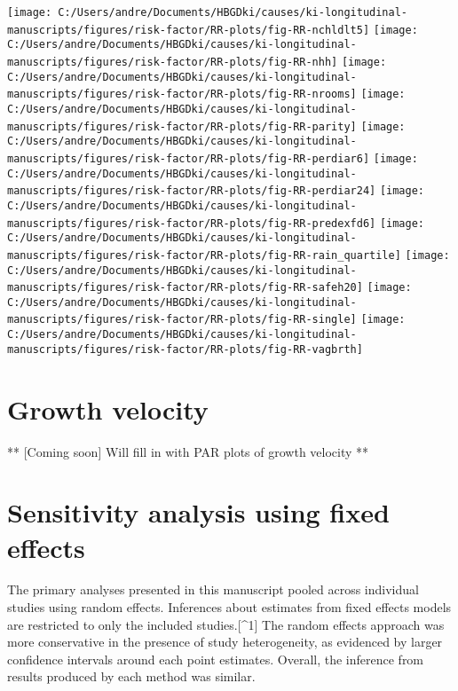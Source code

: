 \documentclass[9pt,]{book}
\begin{document}
\texttt{[image: C:/Users/andre/Documents/HBGDki/causes/ki-longitudinal-manuscripts/figures/risk-factor/RR-plots/fig-RR-nchldlt5]}
\texttt{[image: C:/Users/andre/Documents/HBGDki/causes/ki-longitudinal-manuscripts/figures/risk-factor/RR-plots/fig-RR-nhh]}
\texttt{[image: C:/Users/andre/Documents/HBGDki/causes/ki-longitudinal-manuscripts/figures/risk-factor/RR-plots/fig-RR-nrooms]}
\texttt{[image: C:/Users/andre/Documents/HBGDki/causes/ki-longitudinal-manuscripts/figures/risk-factor/RR-plots/fig-RR-parity]}
\texttt{[image: C:/Users/andre/Documents/HBGDki/causes/ki-longitudinal-manuscripts/figures/risk-factor/RR-plots/fig-RR-perdiar6]}
\texttt{[image: C:/Users/andre/Documents/HBGDki/causes/ki-longitudinal-manuscripts/figures/risk-factor/RR-plots/fig-RR-perdiar24]}
\texttt{[image: C:/Users/andre/Documents/HBGDki/causes/ki-longitudinal-manuscripts/figures/risk-factor/RR-plots/fig-RR-predexfd6]}
\texttt{[image: C:/Users/andre/Documents/HBGDki/causes/ki-longitudinal-manuscripts/figures/risk-factor/RR-plots/fig-RR-rain\_quartile]}
\texttt{[image: C:/Users/andre/Documents/HBGDki/causes/ki-longitudinal-manuscripts/figures/risk-factor/RR-plots/fig-RR-safeh20]}
\texttt{[image: C:/Users/andre/Documents/HBGDki/causes/ki-longitudinal-manuscripts/figures/risk-factor/RR-plots/fig-RR-single]}
\texttt{[image: C:/Users/andre/Documents/HBGDki/causes/ki-longitudinal-manuscripts/figures/risk-factor/RR-plots/fig-RR-vagbrth]}

\chapter{Growth velocity}\label{velocity}

\raggedright

** {[}Coming soon{]} Will fill in with PAR plots of growth velocity **

\chapter{Sensitivity analysis using fixed effects}\label{fixed-effects}

\raggedright

The primary analyses presented in this manuscript pooled across
individual studies using random effects. Inferences about estimates from
fixed effects models are restricted to only the included
studies.{[}\^{}1{]} The random effects approach was more conservative in
the presence of study heterogeneity, as evidenced by larger confidence
intervals around each point estimates. Overall, the inference from
results produced by each method was similar.
\end{document}
